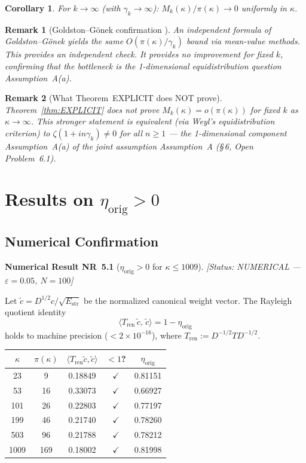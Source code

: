 \documentclass[11pt]{article}
\newtheorem{corollary}[theorem]{Corollary}
\newtheorem*{remark}{Remark}
\newcommand{\Estr}{E_{\mathrm{str}}}
\newcommand{\etaorig}{\eta_{\mathrm{orig}}}
\newcommand{\Tren}{T_{\mathrm{ren}}}
\begin{document}
\begin{corollary}
For $k\to\infty$ (with $\gamma_k\to\infty$):
$M_k(\kappa)/\pi(\kappa)\to 0$ uniformly in $\kappa$.
\end{corollary}

\begin{remark}[Goldston--G\"onek confirmation \cite{GG05}]
An independent formula of Goldston--G\"onek yields the same
$O(\pi(\kappa)/\gamma_k)$ bound via mean-value methods.
This provides an independent check.
It provides no improvement for fixed $k$, confirming that the bottleneck
is the 1-dimensional equidistribution question Assumption~A(a).
\end{remark}

\begin{remark}[What Theorem~EXPLICIT does NOT prove]
Theorem~\ref{thm:EXPLICIT} does not prove
$M_k(\kappa) = o(\pi(\kappa))$ for \emph{fixed} $k$ as $\kappa\to\infty$.
This stronger statement is equivalent (via Weyl's equidistribution criterion)
to $\zeta(1+in\gamma_k)\neq 0$ for all $n\geq 1$ ---
the 1-dimensional component Assumption~A(a) of the joint assumption
Assumption~A (\S\,6, Open Problem~6.1).
\end{remark}

\section{Results on $\etaorig > 0$}

\subsection{Numerical Confirmation}

\textbf{Numerical Result NR~5.1} ($\etaorig > 0$ for $\kappa\leq 1009$).
\emph{[Status: NUMERICAL --- $\varepsilon=0.05$, $N=100$]}

Let $\tilde{c} = D^{1/2}c/\sqrt{\Estr}$ be the normalized canonical
weight vector. The Rayleigh quotient identity
\[
\langle\Tren\,\tilde{c},\,\tilde{c}\rangle = 1 - \etaorig
\]
holds to machine precision ($< 2\times 10^{-16}$),
where $\Tren := D^{-1/2}TD^{-1/2}$.

\begin{center}
\begin{tabular}{ccccc}
\toprule
$\kappa$ & $\pi(\kappa)$ & $\langle\Tren\tilde{c},\tilde{c}\rangle$
  & $< 1$? & $\etaorig$ \\
\midrule
23   & 9   & 0.18849 & $\checkmark$ & 0.81151 \\
53   & 16  & 0.33073 & $\checkmark$ & 0.66927 \\
101  & 26  & 0.22803 & $\checkmark$ & 0.77197 \\
199  & 46  & 0.21740 & $\checkmark$ & 0.78260 \\
503  & 96  & 0.21788 & $\checkmark$ & 0.78212 \\
1009 & 169 & 0.18002 & $\checkmark$ & 0.81998 \\
\bottomrule
\end{tabular}
\end{center}
\end{document}
